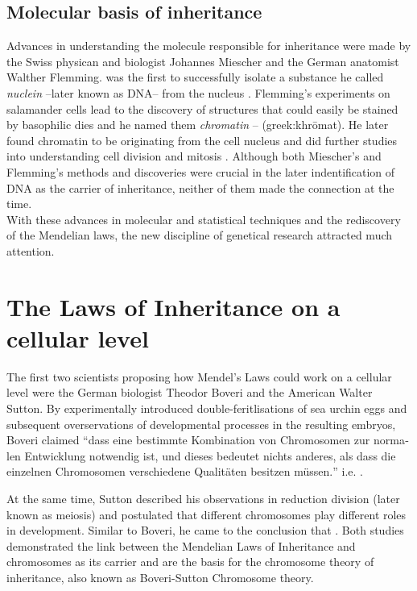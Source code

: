 \subsection{Molecular basis of inheritance}
Advances in understanding the molecule responsible for inheritance were made by the Swiss physican and biologist Johannes Miescher and the German anatomist Walther Flemming.  \citet{Miescher1871} was the first to successfully isolate a substance he called \textit{nuclein} --later known as DNA-- from the nucleus . Flemming's experiments on salamander cells lead to the discovery of structures that could easily be stained by basophilic dies and he named them \textit{chromatin} --   (greek:khrōmat). He later found chromatin to be originating from the cell nucleus and did further studies into understanding cell division and mitosis \parencite*{Flemming1878}. Although both Miescher's and Flemming's methods and discoveries were crucial in the later indentification of DNA as the carrier of inheritance, neither of them made the connection at the time. 
\\
With these advances in molecular and statistical techniques and the rediscovery of the Mendelian laws, the new discipline of genetical research attracted much attention. 

\section{The Laws of Inheritance on a cellular level}
The first two scientists proposing how Mendel's Laws could work on a cellular level were the German biologist Theodor Boveri and the American Walter Sutton. By experimentally introduced double-feritlisations of sea urchin eggs and subsequent overservations of developmental processes in the resulting embryos, Boveri claimed \foreignquote{german}{dass eine bestimmte Kombination von Chromosomen zur normalen Entwicklung notwendig ist, und dieses bedeutet nichts anderes, als dass die einzelnen Chromosomen verschiedene Qualit\"{a}ten besitzen m\"{u}ssen.}  i.e.  \citep{Boveri1902}. 

At the same time, Sutton described his observations in reduction division (later known as meiosis) and postulated that different chromosomes play different roles in development. Similar to Boveri, he came to the conclusion that  \parencite*{Sutton1903}. Both studies demonstrated the link between the Mendelian Laws of Inheritance and chromosomes as its carrier and are the basis for the chromosome theory of inheritance, also known as Boveri-Sutton Chromosome theory. 

